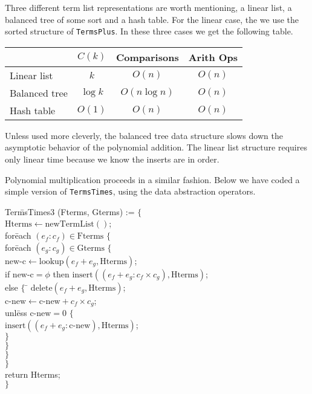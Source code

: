 Three different term list representations are worth mentioning, a
linear list, a balanced tree of some sort and a hash table.  For the
linear case, the we use the sorted structure of {\tt TermsPlus}.  In
these three cases we get the following table.  

\begin{center}
\begin{tabular}{|l|c|c|c|} 
\multicolumn{1}{l}{}& \multicolumn{1}{c}{$C(k)$} & 
  \multicolumn{1}{c}{Comparisons} & \multicolumn{1}{c}{Arith Ops} \\ \hline
Linear list & $k$ & $O(n)$ & $O(n)$ \\ \hline
Balanced tree & $\log k$ & $O(n \log n)$ & $O(n)$ \\ \hline
Hash table & $O(1)$ & $O(n)$ & $O(n)$ \\ \hline
\end{tabular}
\end{center}

Unless used more cleverly, the balanced tree data structure slows down
the asymptotic behavior of the polynomial addition.  The linear list
structure requires only linear time because we know the inserts are in
order.

\medskip
Polynomial multiplication proceeds in a similar fashion.  Below we
have coded a simple version of {\tt TermsTimes}, using the data
abstraction operators.

\begindsacode
Ter\=msTimes3 (Fterms, Gterms) := $\{$ \\
\> $\mbox{Hterms} \leftarrow \mbox{newTermList}()$; \\
\> for\=each $(e_f : c_f) \in \mbox{Fterms}$ $\{$ \\
\>\> for\=each $(e_g : c_g) \in \mbox{Gterms}$ $\{$ \\
\>\>\> $\mbox{new-c} \leftarrow \mbox{lookup}(e_f + e_g, \mbox{Hterms})$;\\
\>\>\> if $\mbox{new-c} = \phi$ then $\mbox{insert}((e_f + e_g : c_f \times c_g), \mbox{Hterms})$;\\
\>\>\> else $\{$ \= $\mbox{delete}(e_f + e_g, \mbox{Hterms})$; \\
\>\>\>\> $\mbox{c-new} \leftarrow \mbox{c-new} + c_f \times c_g$; \\
\>\>\>\> unl\=ess $\mbox{c-new} = 0$ $\{$ \\
\>\>\>\>\> $\mbox{insert}((e_f + e_g : \mbox{c-new}), \mbox{Hterms})$;\\
\>\>\>\>\> $\}$\\
\>\>\>\> $\}$\\
\>\>\> $\}$\\
\>\> $\}$ \\
\> return Hterms; \\
\> $\}$
\enddsacode

